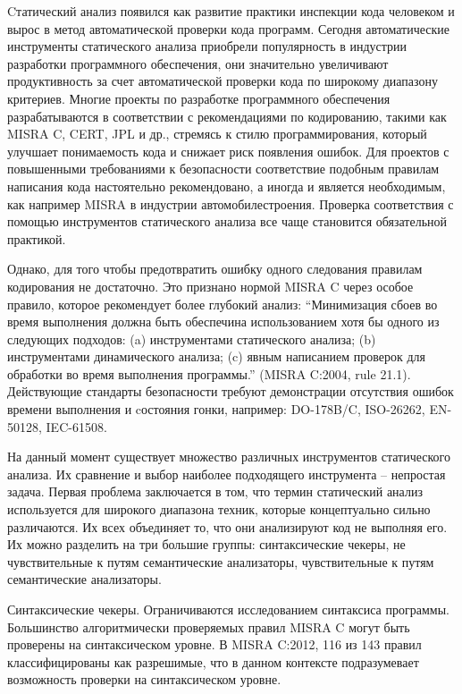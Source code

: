 
{\actuality} Cтатический анализ появился как развитие практики инспекции кода человеком и вырос в метод автоматической проверки кода программ.
Сегодня автоматические инструменты статического анализа приобрели 
популярность в индустрии разработки программного обеспечения, они 
значительно увеличивают продуктивность за счет автоматической проверки кода по
широкому диапазону критериев. Многие проекты по разработке программного обеспечения 
разрабатываются в соответствии с рекомендациями по кодированию,
такими как MISRA C\cite{Misrac1998}, CERT\cite{CERT}, JPL\cite{JPL} и др., стремясь к стилю программирования, 
который улучшает понимаемость кода и снижает риск появления ошибок. Для проектов с
повышенными требованиями к безопасности соответствие подобным правилам написания
кода настоятельно рекомендовано, а иногда и является необходимым, как например MISRA в индустрии автомобилестроения.
Проверка соответствия с помощью инструментов статического анализа все чаще становится обязательной 
практикой.

Однако, для того чтобы предотвратить ошибку одного следования правилам кодирования
не достаточно. Это признано нормой MISRA C через особое правило,
которое рекомендует более глубокий анализ: ``Минимизация сбоев во время выполнения 
должна быть обеспечина использованием хотя бы одного из следующих подходов: 
(a) инструментами статического анализа; (b) инструментами динамического анализа;
(c) явным написанием проверок для обработки во время выполнения программы.''
(MISRA C:2004, rule 21.1). Действующие стандарты безопасности требуют демонстрации
отсутствия ошибок времени выполнения и cостояния гонки, например: DO-178B/C, ISO-26262,
EN-50128, IEC-61508.

На данный момент существует множество различных инструментов статического анализа.
Их сравнение и выбор наиболее подходящего инструмента -- непростая задача. 
Первая проблема заключается в том, что термин статический анализ используется 
для широкого диапазона техник, которые концептуально сильно различаются.
Их всех объединяет то, что они анализируют код не выполняя его. Их можно
разделить на три большие группы: синтаксические чекеры, не чувствительные к путям 
семантические анализаторы, чувствительные к путям семантические анализаторы. 

Синтаксические чекеры. Ограничиваются исследованием синтаксиса программы. 
Большинство алгоритмически проверяемых правил MISRA C могут быть проверены 
на синтаксическом уровне. В MISRA C:2012, 116 из 143 правил классифицированы 
как разрешимые, что в данном контексте подразумевает возможность проверки 
на синтаксическом уровне.

